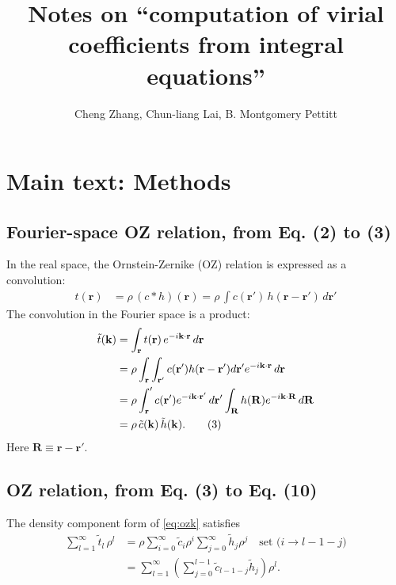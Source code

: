 \documentclass[preprint]{revtex4-1}
\numberwithin{equation}{subsection}
\numberwithin{table}{section}
\newcommand{\vct}[1]{\mathbf{#1}}
\providecommand{\vr}{} %
\renewcommand{\vr}{\vct{r}}
\newcommand{\vk}{\vct{k}}
\newcommand{\vR}{\vct{R}}
\begin{document}
\title{Notes on ``computation of virial coefficients from integral equations''}
\author{Cheng Zhang, Chun-liang Lai, B. Montgomery Pettitt}

\maketitle

\tableofcontents




\section{Main text: Methods}


\subsection{Fourier-space OZ relation, from Eq. (2) to (3)}

In the real space, the Ornstein-Zernike (OZ) relation
is expressed as a convolution:
\begin{align}
  t(\vr)
&= \rho \, (c*h)(\vr)
= \rho \, \int c(\vr') \, h(\vr - \vr') \, d\vr'
  \tag{2}
  \label{eq:oz}
\end{align}
The convolution in the Fourier space is a product:
\begin{align}
  \tilde{t}(\vk)
&= \int_\vr t(\vr) \, e^{-i\vk \cdot \vr} \, d\vr
  \notag \\
&= \rho \int_\vr \int_{\vr'} c(\vr') h(\vr - \vr') d\vr' e^{-i\vk \cdot \vr} \, d\vr
  \notag \\
&= \rho \int_\vr' c(\vr') e^{-i\vk \cdot \vr'} \, d\vr'
        \int_\vR h(\vR) e^{-i\vk \cdot \vR} \, d\vR
  \notag \\
&= \rho \, \tilde{c}(\vk) \, \tilde{h}(\vk).
  \tag{3}
  \label{eq:ozk}
\end{align}
%
Here $\vR \equiv \vr - \vr'$.



\subsection{OZ relation, from Eq. (3) to Eq. (10)}

The density component form of \eqref{eq:ozk} satisfies
\begin{align*}
  \sum_{l = 1}^{\infty} \tilde{t}_l \, \rho^l
  &=
  \rho \sum_{i = 0}^{\infty} \tilde{c}_i \rho^i
  \sum_{j = 0}^{\infty} \tilde{h}_j \rho^j
  \quad \mbox{set ($i \rightarrow l - 1 - j$)}
  \\
  &=
  \sum_{l = 1}^{\infty}
  \left(
  \sum_{j = 0}^{l-1}
    \tilde{c}_{l-1-j} \tilde{h}_j \right) \rho^l.
\end{align*}
\end{document}
